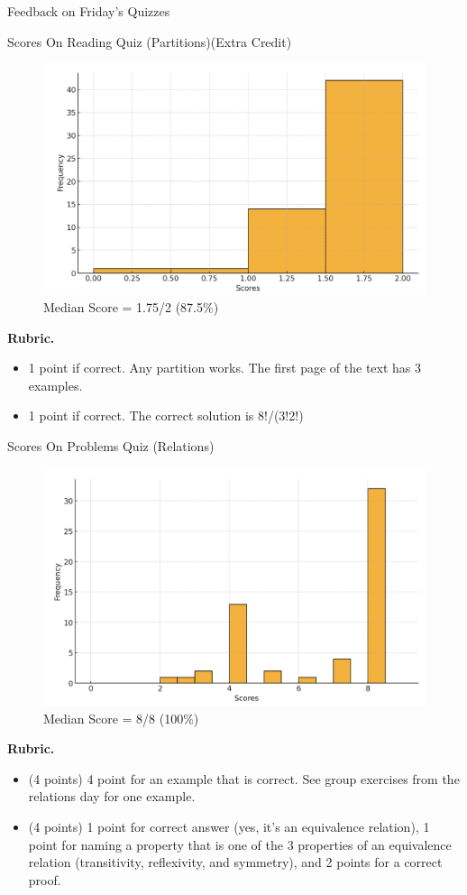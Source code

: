 \documentclass[10pt]{beamer}
\begin{document}
\begin{frame}[standout]
Feedback on Friday's Quizzes 
\end{frame}



\begin{frame}{Scores On Reading Quiz (Partitions)(Extra Credit)}
\footnotesize 
\begin{figure}[ht]
        \centering
        \includegraphics[width=.7\textwidth]{images/reading_quiz_scores}
   		 \caption{Median Score = 1.75/2 (87.5\%)}
\end{figure}
\vfill 
\textbf{Rubric.}  	
\begin{itemize}
\item  1 point if correct.  Any partition works.  The first page of the text has 3 examples.
\item 1 point if correct.  The correct solution is 8!/(3!2!)
\end{itemize}
\end{frame}


\begin{frame}{Scores On Problems Quiz (Relations)}
\footnotesize 
\begin{figure}[ht]
        \centering
        \includegraphics[width=.6\textwidth]{images/problem_quiz_scores}
   		 \caption{Median Score = 8/8 (100\%)}
\end{figure}
\vfill 
\textbf{Rubric.}  	
\begin{itemize}
\item  (4 points) 4 point for an example that is correct.  See group exercises from the relations day for one example.
\item (4 points) 1 point for correct answer (yes, it’s an equivalence relation), 1 point for naming a property that is one of the 3 properties of an equivalence relation (transitivity, reflexivity, and symmetry), and 2 points for a correct proof.
\end{itemize}
\end{frame}
\end{document}
